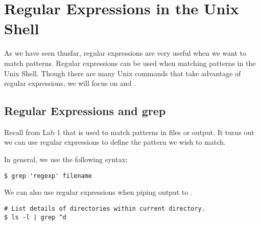 \begin{comment}
Instead, use your previously defined regular expressions to make this easier. For example, either of the two following idioms will work:
\begin{lstlisting}
>>> key_1 = "basic"
>>> print ("This is a " + key_1 + " way to concatenate strings.")
This is a basic way to concatenate strings.
>>> format_dict = {"key_1": "basic", "key_2": "much more", "key_3": "advanced"}
>>> print ("This is a {key_2} {key_3} way to concatenate strings. It's {key_2} flexible.".format(**format_dict))
This is a much more advanced way to concatenate strings. It's much more flexible.
\end{lstlisting}
Keep in mind that you'll have to remove the line anchors from your previously defined regular expressions.

For reference, I used about ten lines to define \li{function_pattern_string} and used statements of the form \li{intermediate_pattern_string = r"(my regular expression here)".format()} four times.
\end{warn}

\label{prob:match_function_definition}
\end{problem*}
\end{comment}

\section*{Regular Expressions in the Unix Shell}
As we have seen thusfar, regular expressions are very useful when we want to match patterns. Regular expressions can be used when matching patterns in the Unix Shell. Though there are many Unix commands that take advantage of regular expressions, we will focus on  and .

\subsection*{Regular Expressions and grep}
Recall from Lab 1 that  is used to match patterns in files or output. It turns out we can use regular expressions to define the pattern we wish to match.

In general, we use the following syntax:
\begin{lstlisting}
$ grep 'regexp' filename
\end{lstlisting}

We can also use regular expressions when piping output to .
\begin{lstlisting}
# List details of directories within current directory.
$ ls -l | grep ^d
\end{lstlisting} 


